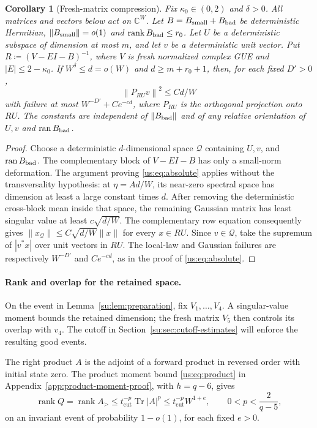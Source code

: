 \documentclass[11pt]{article}
\numberwithin{equation}{section}
\newtheorem{corollary}[theorem]{Corollary}
\theoremstyle{remark}
\newcommand{\C}{\mathbb C}
\newcommand{\Tr}{\operatorname{Tr}}
\newcommand{\rank}{\operatorname{rank}}
\newcommand{\ran}{\operatorname{ran}}
\newcommand{\norm}[1]{\left\|#1\right\|}
\begin{document}
\begin{corollary}[Fresh-matrix compression]\label{nc:lem:compression}
Fix $\kappa_0\in(0,2)$ and $\delta>0$. All matrices and vectors below
act on $\C^W$.
Let $B=B_{\rm small}+B_{\rm bad}$ be deterministic Hermitian,
$\norm{B_{\rm small}}=o(1)$ and $\rank B_{\rm bad}\le r_0$.
Let $U$ be a deterministic subspace of dimension at most $m$, and let
$v$ be a deterministic unit vector. Put $R\coloneqq (V-EI-B)^{-1}$, where
$V$ is fresh normalized complex GUE and $|E|\le2-\kappa_0$.
If $W^\delta\le d=o(W)$ and $d\ge m+r_0+1$, then, for each fixed $D'>0$,
\begin{equation}
 \norm{P_{RU}v}^2\le Cd/W
 \label{nc:eq:compression}
\end{equation}
with failure at most $W^{-D'}+Ce^{-cd}$, where $P_{RU}$ is the
orthogonal projection onto $RU$. The constants are independent
of $\norm{B_{\rm bad}}$ and of any relative orientation of $U,v$ and
$\ran B_{\rm bad}$.
\end{corollary}
\begin{proof}
Choose a deterministic \(d\)-dimensional space \(\mathcal Q\)
containing \(U,v\), and \(\operatorname{ran}B_{\rm bad}\).
The complementary block of \(V-EI-B\) has only a small-norm deformation.
The argument proving \eqref{us:eq:absolute} applies without the
transversality hypothesis: at \(\eta=Ad/W\), its near-zero spectral
space has dimension at least a large constant times \(d\).
After removing the deterministic cross-block mean inside that space,
the remaining Gaussian matrix has least singular value at least
\(c\sqrt{d/W}\). The complementary row equation consequently gives
\(\|x_{\mathcal Q}\|\le C\sqrt{d/W}\|x\|\) for every \(x\in RU\).
Since \(v\in\mathcal Q\), take the supremum of \(|v^*x|\) over unit
vectors in \(RU\). The local-law and Gaussian failures are respectively
\(W^{-D'}\) and \(Ce^{-cd}\), as in the proof of \eqref{us:eq:absolute}.
\end{proof}

\paragraph{Rank and overlap for the retained space.}
On the event in Lemma~\ref{su:lem:preparation}, fix $V_1,\ldots,V_4$.
A singular-value moment bounds the retained dimension; the fresh matrix
$V_5$ then controls its overlap with $v_4$. The cutoff in
Section~\ref{su:sec:cutoff-estimates} will enforce the resulting good events.

The right product $A$ is the adjoint of a forward product in reversed
order with initial state zero. The product moment bound \eqref{us:eq:product} in
Appendix~\ref{app:product-moment-proof}, with $h=q-6$, gives
\begin{equation}\label{su:eq:retained-rank-moment}
 \rank Q=\rank A_>\le t_{\mathrm{cut}}^{-p}\Tr|A|^p
 \le t_{\mathrm{cut}}^{-p}W^{1+e},\qquad 0<p<\frac2{q-5},
\end{equation}
on an invariant event of probability $1-o(1)$, for each fixed $e>0$.
\end{document}
